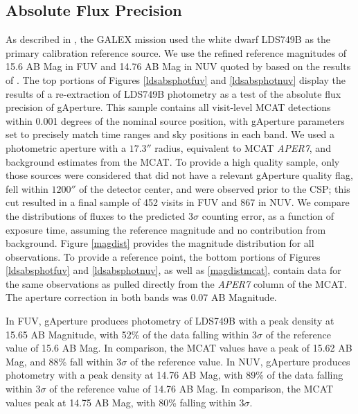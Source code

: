 \documentclass[preprint]{aastex}
\begin{document}
\subsection{Absolute Flux Precision}
As described in \citet{mor2007}, the GALEX mission used the white dwarf LDS749B as the primary calibration reference source. We use the refined reference magnitudes of 15.6 AB Mag in FUV and 14.76 AB Mag in NUV quoted by \cite{camarota2014white} based on the results of \cite{bohlin2008absolute}. The top portions of Figures \ref{ldsabsphotfuv} and \ref{ldsabsphotnuv} display the results of a re-extraction of LDS749B photometry as a test of the absolute flux precision of gAperture. This sample contains all visit-level MCAT detections within 0.001 degrees of the nominal source position, with gAperture parameters set to precisely match time ranges and sky positions in each band. We used a photometric aperture with a $17.3''$ radius, equivalent to MCAT \emph{APER7}, and background estimates from the MCAT. To provide a high quality sample, only those sources were considered that did not have a relevant gAperture quality flag, fell within $1200''$ of the detector center, and were observed prior to the CSP; this cut resulted in a final sample of 452 visits in FUV and 867 in NUV. We compare the distributions of fluxes to the predicted 3$\sigma$ counting error, as a function of exposure time, assuming the reference magnitude and no contribution from background. Figure \ref{magdist} provides the magnitude distribution for all observations. To provide a reference point, the bottom portions of Figures \ref{ldsabsphotfuv} and \ref{ldsabsphotnuv}, as well as \ref{magdistmcat}, contain data for the same observations as pulled directly from the \emph{APER7} column of the MCAT. The aperture correction in both bands was 0.07 AB Magnitude.

In FUV, gAperture produces photometry of LDS749B with a peak density at 15.65 AB Magnitude, with 52\% of the data falling within 3$\sigma$ of the reference value of 15.6 AB Mag. In comparison, the MCAT values have a peak of 15.62 AB Mag, and 88\% fall within 3$\sigma$ of the reference value. In NUV, gAperture produces photometry with a peak density at 14.76 AB Mag, with 89\% of the data falling within 3$\sigma$ of the reference value of 14.76 AB Mag. In comparison, the MCAT values peak at 14.75 AB Mag, with 80\% falling within 3$\sigma$.
\end{document}
